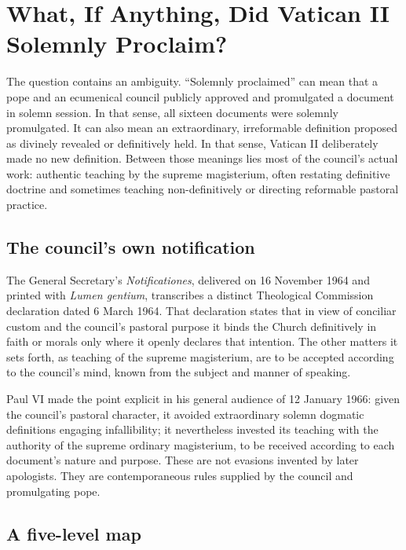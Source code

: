 \section{What, If Anything, Did Vatican II Solemnly Proclaim?}

The question contains an ambiguity. “Solemnly proclaimed” can mean that a pope and an ecumenical council publicly approved and promulgated a document in solemn session. In that sense, all sixteen documents were solemnly promulgated. It can also mean an extraordinary, irreformable definition proposed as divinely revealed or definitively held. In that sense, Vatican II deliberately made no new definition. Between those meanings lies most of the council's actual work: authentic teaching by the supreme magisterium, often restating definitive doctrine and sometimes teaching non-definitively or directing reformable pastoral practice.

\subsection{The council's own notification}

The General Secretary's \emph{Notificationes}, delivered on 16 November 1964 and printed with \emph{Lumen gentium}, transcribes a distinct Theological Commission declaration dated 6 March 1964. That declaration states that in view of conciliar custom and the council's pastoral purpose it binds the Church definitively in faith or morals only where it openly declares that intention. The other matters it sets forth, as teaching of the supreme magisterium, are to be accepted according to the council's mind, known from the subject and manner of speaking.

Paul VI made the point explicit in his general audience of 12 January 1966: given the council's pastoral character, it avoided extraordinary solemn dogmatic definitions engaging infallibility; it nevertheless invested its teaching with the authority of the supreme ordinary magisterium, to be received according to each document's nature and purpose. These are not evasions invented by later apologists. They are contemporaneous rules supplied by the council and promulgating pope.

\subsection{A five-level map}

